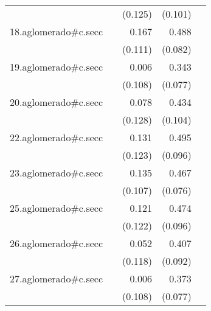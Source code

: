 {\begin{longtable}{l*{4}{D{.}{.}{-1}}}
            &                     &     (0.125)         &     (0.101)         &                     \\
\addlinespace
18.aglomerado#c.secc&                     &       0.167         &       0.488\sym{***}&                     \\
            &                     &     (0.111)         &     (0.082)         &                     \\
\addlinespace
19.aglomerado#c.secc&                     &       0.006         &       0.343\sym{***}&                     \\
            &                     &     (0.108)         &     (0.077)         &                     \\
\addlinespace
20.aglomerado#c.secc&                     &       0.078         &       0.434\sym{***}&                     \\
            &                     &     (0.128)         &     (0.104)         &                     \\
\addlinespace
22.aglomerado#c.secc&                     &       0.131         &       0.495\sym{***}&                     \\
            &                     &     (0.123)         &     (0.096)         &                     \\
\addlinespace
23.aglomerado#c.secc&                     &       0.135         &       0.467\sym{***}&                     \\
            &                     &     (0.107)         &     (0.076)         &                     \\
\addlinespace
25.aglomerado#c.secc&                     &       0.121         &       0.474\sym{***}&                     \\
            &                     &     (0.122)         &     (0.096)         &                     \\
\addlinespace
26.aglomerado#c.secc&                     &       0.052         &       0.407\sym{***}&                     \\
            &                     &     (0.118)         &     (0.092)         &                     \\
\addlinespace
27.aglomerado#c.secc&                     &       0.006         &       0.373\sym{***}&                     \\
            &                     &     (0.108)         &     (0.077)         &                     \\

\end{longtable}}
